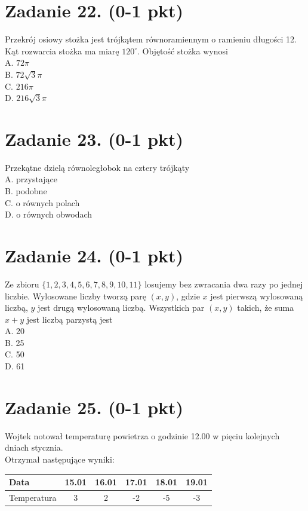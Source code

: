 \documentclass[10pt]{article}
\begin{document}
\section*{Zadanie 22. (0-1 pkt)}
Przekrój osiowy stożka jest trójkątem równoramiennym o ramieniu długości 12. Kąt rozwarcia stożka ma miarę \(120^{\circ}\). Objętość stożka wynosi\\
A. \(72 \pi\)\\
B. \(72 \sqrt{3} \pi\)\\
C. \(216 \pi\)\\
D. \(216 \sqrt{3} \pi\)

\section*{Zadanie 23. (0-1 pkt)}
Przekątne dzielą równoległobok na cztery trójkąty\\
A. przystające\\
B. podobne\\
C. o równych polach\\
D. o równych obwodach

\section*{Zadanie 24. (0-1 pkt)}
Ze zbioru \(\{1,2,3,4,5,6,7,8,9,10,11\}\) losujemy bez zwracania dwa razy po jednej liczbie. Wylosowane liczby tworzą parę \((x, y)\), gdzie \(x\) jest pierwszą wylosowaną liczbą, \(y\) jest drugą wylosowaną liczbą. Wszystkich par \((x, y)\) takich, że suma \(x+y\) jest liczbą parzystą jest\\
A. 20\\
B. 25\\
C. 50\\
D. 61

\section*{Zadanie 25. (0-1 pkt)}
Wojtek notował temperaturę powietrza o godzinie 12.00 w pięciu kolejnych dniach stycznia.\\
Otrzymał następujące wyniki:

\begin{center}
\begin{tabular}{|l|c|c|c|c|c|}
\hline
Data & 15.01 & 16.01 & 17.01 & 18.01 & 19.01 \\
\hline
Temperatura & 3 & 2 & -2 & -5 & -3 \\
\hline
\end{tabular}
\end{center}
\end{document}
